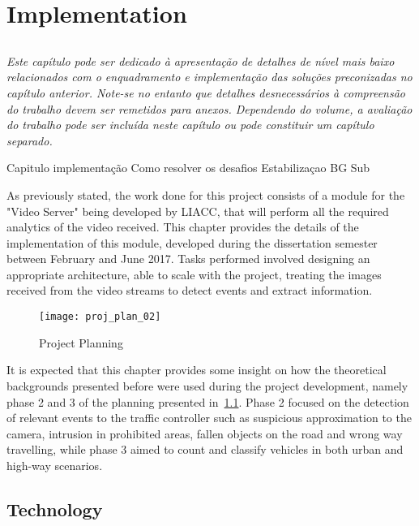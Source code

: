 
\chapter{Implementation}\label{chap:chap4}
\section*{}

\textit{
Este capítulo pode ser dedicado à apresentação de detalhes de nível
mais baixo relacionados com o enquadramento e implementação das
soluções preconizadas no capítulo anterior.
Note-se no entanto que detalhes desnecessários à compreensão do
trabalho devem ser remetidos para anexos.
Dependendo do volume, a avaliação do trabalho pode ser incluída neste
capítulo ou pode constituir um capítulo separado.
}


Capitulo implementação
Como resolver os desafios 
  Estabilizaçao BG Sub


As previously stated, the work done for this project consists of a module for the "Video Server" being developed by LIACC, that will perform all the required analytics of the video received. This chapter provides the details of the implementation of this module, developed during the dissertation semester between February and June 2017. Tasks performed involved designing an appropriate architecture, able to scale with the project, treating the images received from the video streams to detect events and extract information. 

\begin{figure}[h]
  \begin{center}
    \leavevmode
    \texttt{[image: proj\_plan\_02]}
    \caption{Project Planning}
    \label{fig:proj_plan}
  \end{center}
\end{figure}


It is expected that this chapter provides some insight on how the theoretical backgrounds presented before were used during the project development, namely phase 2 and 3 of the planning presented in~\ref{fig:proj_plan}. Phase 2 focused on the detection of relevant events to the traffic controller such as suspicious approximation to the camera, intrusion in prohibited areas, fallen objects on the road and wrong way travelling, while phase 3 aimed to count and classify vehicles in both urban and high-way scenarios.

\section{Technology}

